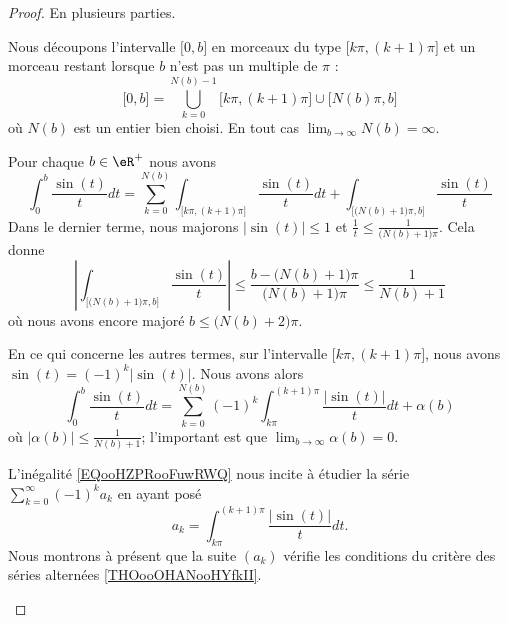 \begin{proof}
	En plusieurs parties.
	\begin{subproof}
		\spitem[Découpage]

		Nous découpons l'intervalle \( \mathopen[ 0 , b \mathclose]\) en morceaux du type \( \mathopen[ k\pi , (k+1)\pi \mathclose]\) et un morceau restant lorsque \( b\) n'est pas un multiple de \( \pi\) :
		\begin{equation}
			\mathopen[ 0 , b \mathclose]=\bigcup_{k=0}^{N(b)-1}\mathopen[ k\pi , (k+1)\pi \mathclose]\cup\mathopen[ N(b)\pi , b \mathclose]
		\end{equation}
		où \( N(b)\) est un entier bien choisi. En tout cas \( \lim_{b\to \infty}N(b)=\infty\).

		\spitem[Majoration 1]

		Pour chaque \( b\in \eR^+\) nous avons
		\begin{equation}
			\int_0^b\frac{ \sin(t) }{ t }dt=\sum_{k=0}^{N(b)}\int_{\mathopen\big[ k\pi , (k+1)\pi \mathclose\big]}\frac{ \sin(t) }{ t }dt+\int_{\mathopen[ \big( N(b)+1 \big)\pi , b \mathclose]}\frac{ \sin(t) }{ t }
		\end{equation}
		Dans le dernier terme, nous majorons \( | \sin(t) |\leq 1\) et \( \frac{1}{ t }\leq \frac{1}{\big( N(b)+1 \big)\pi}\). Cela donne
		\begin{equation}
			\left|  \int_{\mathopen\big[ \big(N(b)+1\big)\pi  , b \mathclose\big]}\frac{ \sin(t) }{ t } \right|\leq \frac{ b-\big( N(b)+1 \big)\pi }{ \big( N(b)+1 \big)\pi }\leq \frac{1}{ N(b)+1 }
		\end{equation}
		où nous avons encore majoré \( b\leq \big( N(b)+2 \big)\pi\).

		\spitem[Majoration 2]

		En ce qui concerne les autres termes, sur l'intervalle \( \mathopen[ k\pi , (k+1)\pi \mathclose]\), nous avons \( \sin(t)=(-1)^k| \sin(t) |\). Nous avons alors
		\begin{equation}        \label{EQooHZPRooFuwRWQ}
			\int_0^b\frac{ \sin(t) }{ t }dt=\sum_{k=0}^{N(b)}(-1)^k\int_{k\pi}^{(k+1)\pi}\frac{ | \sin(t) | }{ t }dt+\alpha(b)
		\end{equation}
		où \( | \alpha(b) |\leq \frac{1}{ N(b)+1 }\); l'important est que \( \lim_{b\to \infty}\alpha(b)=0\).


		L'inégalité \eqref{EQooHZPRooFuwRWQ} nous incite à étudier la série \( \sum_{k=0}^{\infty}(-1)^ka_k\) en ayant posé
		\begin{equation}
			a_k=\int_{k\pi}^{(k+1)\pi}\frac{ | \sin(t) | }{ t }dt.
		\end{equation}
		Nous montrons à présent que la suite \( (a_k)\) vérifie les conditions du critère des séries alternées \ref{THOooOHANooHYfkII}.


\end{subproof}
\end{proof}
